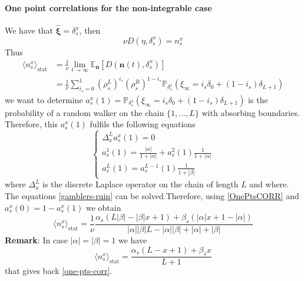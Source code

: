 \documentclass[10pt]{article}
\numberwithin{equation}{section}
\numberwithin{equation}{subsection}
\begin{document}
\paragraph{One point correlations for the non-integrable case}
We have that $\widehat{\bm{\xi}}=\delta_{s}^{x}$, then 
\begin{equation}
	\nu D(\eta,\delta_{s}^{x})=n_{s}^{x}
\end{equation}
Thus
\begin{equation}\label{OnePtsCORR}
	\begin{split}
		\langle n_{s}^{x}\rangle_{\text{stat}}&=\frac{1}{\nu}\lim_{t\to\infty}\mathbb{E}_{\bm{n}}\left[D(\bm{n}(t),\delta_{s}^{x})\right]\\&=\frac{1}{\nu}\sum_{i_{s}=0}^{1}\left(\rho_{s}^{L}\right)^{i_{s}}\left(\rho_{s}^{R}\right)^{1-i_{s}}\mathbb{P}_{\delta_{s}^{x}}\left(\xi_{\infty}=i_{s}\delta_{0}+(1-i_{s})\delta_{L+1}\right)
	\end{split}
\end{equation}
we want to determine $a^{x}_{s}(1)=\mathbb{P}_{\delta_{s}^{x}}\left(\xi_{\infty}=i_{s}\delta_{0}+(1-i_{s})\delta_{L+1}\right)$ is the probability of a random walker on the chain $\{1,\ldots,L\}$ with absorbing boundaries. Therefore, this $a_{s}^{x}(1)$ fulfils the following equations 
\begin{equation}\label{gamblers-ruin}
	\begin{cases}
		\Delta_{x}^{L}a^{x}_{s}(1)=0\\
		a^{1}_{s}(1)=\frac{|\alpha|}{1+|\alpha|}+a^{2}_{s}(1)\frac{1}{1+|\alpha|}\\
		a^{L}_{s}(1)=a^{L-1}_{s}(1)\frac{1}{1+|\beta|}
	\end{cases}
\end{equation}
where $\Delta_{x}^{L}$ is the discrete Laplace operator on the chain of length $L$ and where. The equations \eqref{gamblers-ruin} can be solved.Therefore, using \eqref{OnePtsCORR} and $a^{x}_{s}(0)=1-a^{x}_{s}(1)$ we obtain 
\begin{equation}
	\langle n_{s}^{x}\rangle_{\text{stat}}=\frac{1}{\nu}\frac{\alpha_{s}(L|\beta|-|\beta|x+1)+\beta_{s}(|\alpha|x+1-|\alpha|)}{|\alpha||\beta|L-|\alpha||\beta|+|\alpha|+|\beta|}
\end{equation}
\textbf{Remark}: In case $|\alpha|=|\beta|=1$ we have 
\begin{equation}
	\langle n_{s}^{x}\rangle_{\text{stat}}=\frac{\alpha_{s}(L-x+1)+\beta_{s}x}{L+1}
\end{equation}
that gives back \eqref{one-pts-corr}.
\end{document}
